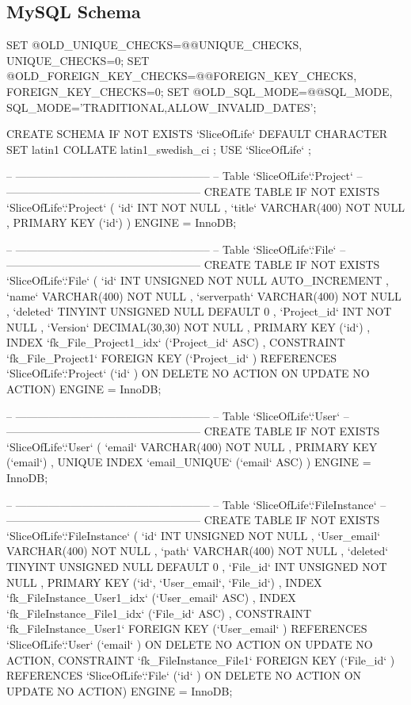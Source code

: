 \subsection{MySQL Schema}
\begin{spverbatim}
SET @OLD_UNIQUE_CHECKS=@@UNIQUE_CHECKS, UNIQUE_CHECKS=0;
SET @OLD_FOREIGN_KEY_CHECKS=@@FOREIGN_KEY_CHECKS, FOREIGN_KEY_CHECKS=0;
SET @OLD_SQL_MODE=@@SQL_MODE, SQL_MODE='TRADITIONAL,ALLOW_INVALID_DATES';

CREATE SCHEMA IF NOT EXISTS `SliceOfLife` DEFAULT CHARACTER SET latin1 COLLATE latin1_swedish_ci ;
USE `SliceOfLife` ;

-- -----------------------------------------------------
-- Table `SliceOfLife`.`Project`
-- -----------------------------------------------------
CREATE  TABLE IF NOT EXISTS `SliceOfLife`.`Project` (
  `id` INT NOT NULL ,
  `title` VARCHAR(400) NOT NULL ,
  PRIMARY KEY (`id`) )
ENGINE = InnoDB;


-- -----------------------------------------------------
-- Table `SliceOfLife`.`File`
-- -----------------------------------------------------
CREATE  TABLE IF NOT EXISTS `SliceOfLife`.`File` (
  `id` INT UNSIGNED NOT NULL AUTO_INCREMENT ,
  `name` VARCHAR(400) NOT NULL ,
  `serverpath` VARCHAR(400) NOT NULL ,
  `deleted` TINYINT UNSIGNED NULL DEFAULT 0 ,
  `Project_id` INT NOT NULL ,
  `Version` DECIMAL(30,30) NOT NULL ,
  PRIMARY KEY (`id`) ,
  INDEX `fk_File_Project1_idx` (`Project_id` ASC) ,
  CONSTRAINT `fk_File_Project1`
    FOREIGN KEY (`Project_id` )
    REFERENCES `SliceOfLife`.`Project` (`id` )
    ON DELETE NO ACTION
    ON UPDATE NO ACTION)
ENGINE = InnoDB;


-- -----------------------------------------------------
-- Table `SliceOfLife`.`User`
-- -----------------------------------------------------
CREATE  TABLE IF NOT EXISTS `SliceOfLife`.`User` (
  `email` VARCHAR(400) NOT NULL ,
  PRIMARY KEY (`email`) ,
  UNIQUE INDEX `email_UNIQUE` (`email` ASC) )
ENGINE = InnoDB;


-- -----------------------------------------------------
-- Table `SliceOfLife`.`FileInstance`
-- -----------------------------------------------------
CREATE  TABLE IF NOT EXISTS `SliceOfLife`.`FileInstance` (
  `id` INT UNSIGNED NOT NULL ,
  `User_email` VARCHAR(400) NOT NULL ,
  `path` VARCHAR(400) NOT NULL ,
  `deleted` TINYINT UNSIGNED NULL DEFAULT 0 ,
  `File_id` INT UNSIGNED NOT NULL ,
  PRIMARY KEY (`id`, `User_email`, `File_id`) ,
  INDEX `fk_FileInstance_User1_idx` (`User_email` ASC) ,
  INDEX `fk_FileInstance_File1_idx` (`File_id` ASC) ,
  CONSTRAINT `fk_FileInstance_User1`
    FOREIGN KEY (`User_email` )
    REFERENCES `SliceOfLife`.`User` (`email` )
    ON DELETE NO ACTION
    ON UPDATE NO ACTION,
  CONSTRAINT `fk_FileInstance_File1`
    FOREIGN KEY (`File_id` )
    REFERENCES `SliceOfLife`.`File` (`id` )
    ON DELETE NO ACTION
    ON UPDATE NO ACTION)
ENGINE = InnoDB;



\end{spverbatim}
